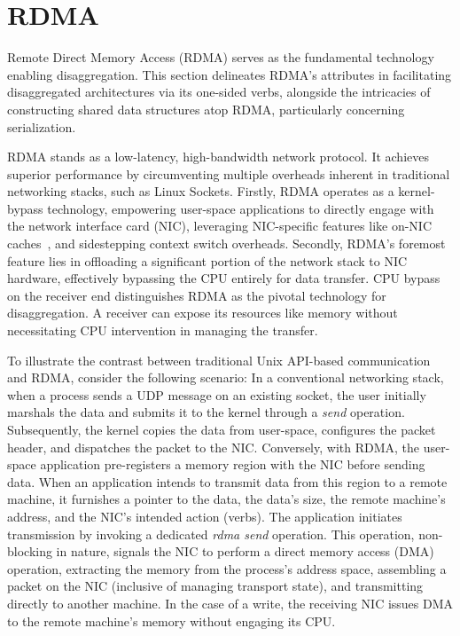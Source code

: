 \documentclass[12pt]{ucsddissertation}
\begin{document}
\section{RDMA}
\label{sec:rdma}

Remote Direct Memory Access (RDMA) serves as the fundamental technology enabling disaggregation.
This section delineates RDMA's attributes in facilitating disaggregated architectures via its
one-sided verbs, alongside the intricacies of constructing shared data structures atop RDMA,
particularly concerning serialization.

RDMA stands as a low-latency, high-bandwidth network protocol. It achieves superior performance by
circumventing multiple overheads inherent in traditional networking stacks, such as Linux Sockets.
Firstly, RDMA operates as a kernel-bypass technology, empowering user-space applications to directly
engage with the network interface card (NIC), leveraging NIC-specific features like on-NIC
caches~\cite{sherman}, and sidestepping context switch overheads. Secondly, RDMA's foremost feature
lies in offloading a significant portion of the network stack to NIC hardware, effectively bypassing
the CPU entirely for data transfer. CPU bypass on the receiver end distinguishes RDMA as the pivotal
technology for disaggregation. A receiver can expose its resources like memory without necessitating
CPU intervention in managing the transfer.

To illustrate the contrast between traditional Unix API-based communication and RDMA, consider the
following scenario: In a conventional networking stack, when a process sends a UDP message on an
existing socket, the user initially marshals the data and submits it to the kernel through a
\textit{send} operation. Subsequently, the kernel copies the data from user-space, configures the
packet header, and dispatches the packet to the NIC. Conversely, with RDMA, the user-space
application pre-registers a memory region with the NIC before sending data. When an application
intends to transmit data from this region to a remote machine, it furnishes a pointer to the data,
the data's size, the remote machine's address, and the NIC's intended action (verbs). The
application initiates transmission by invoking a dedicated \textit{rdma send} operation. This
operation, non-blocking in nature, signals the NIC to perform a direct memory access (DMA)
operation, extracting the memory from the process's address space, assembling a packet on the NIC
(inclusive of managing transport state), and transmitting directly to another machine. In the case
of a write, the receiving NIC issues DMA to the remote machine's memory without engaging its CPU.
\end{document}
